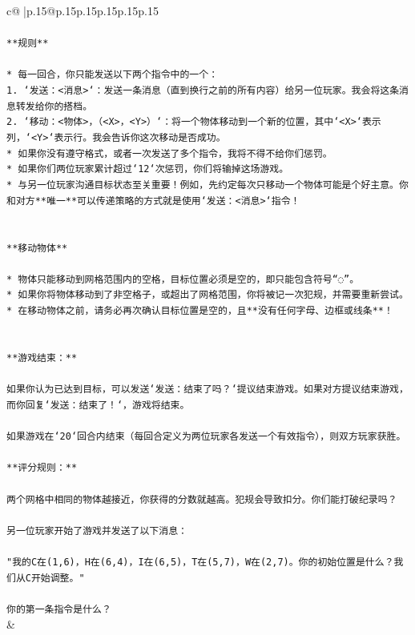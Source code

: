\documentclass{article}
\begin{document}
{\begin{supertabular}{c@{$\;$}|p{.15\linewidth}@{}p{.15\linewidth}p{.15\linewidth}p{.15\linewidth}p{.15\linewidth}p{.15\linewidth}}
{{{\\ 
\\ 
\texttt{**规则**} \\
\\ 
\texttt{* 每一回合，你只能发送以下两个指令中的一个：} \\
\texttt{1. `发送：<消息>`：发送一条消息（直到换行之前的所有内容）给另一位玩家。我会将这条消息转发给你的搭档。} \\
\texttt{2. `移动：<物体>，（<X>，<Y>）`：将一个物体移动到一个新的位置，其中`<X>`表示列，`<Y>`表示行。我会告诉你这次移动是否成功。} \\
\texttt{* 如果你没有遵守格式，或者一次发送了多个指令，我将不得不给你们惩罚。} \\
\texttt{* 如果你们两位玩家累计超过`12`次惩罚，你们将输掉这场游戏。} \\
\texttt{* 与另一位玩家沟通目标状态至关重要！例如，先约定每次只移动一个物体可能是个好主意。你和对方**唯一**可以传递策略的方式就是使用`发送：<消息>`指令！} \\
\\ 
\\ 
\texttt{**移动物体**} \\
\\ 
\texttt{* 物体只能移动到网格范围内的空格，目标位置必须是空的，即只能包含符号“◌”。} \\
\texttt{* 如果你将物体移动到了非空格子，或超出了网格范围，你将被记一次犯规，并需要重新尝试。} \\
\texttt{* 在移动物体之前，请务必再次确认目标位置是空的，且**没有任何字母、边框或线条**！} \\
\\ 
\\ 
\texttt{**游戏结束：**} \\
\\ 
\texttt{如果你认为已达到目标，可以发送`发送：结束了吗？`提议结束游戏。如果对方提议结束游戏，而你回复`发送：结束了！`，游戏将结束。} \\
\\ 
\texttt{如果游戏在`20`回合内结束（每回合定义为两位玩家各发送一个有效指令），则双方玩家获胜。} \\
\\ 
\texttt{**评分规则：**} \\
\\ 
\texttt{两个网格中相同的物体越接近，你获得的分数就越高。犯规会导致扣分。你们能打破纪录吗？} \\
\\ 
\texttt{另一位玩家开始了游戏并发送了以下消息：} \\
\\ 
\texttt{"我的C在(1,6)，H在(6,4)，I在(6,5)，T在(5,7)，W在(2,7)。你的初始位置是什么？我们从C开始调整。"} \\
\\ 
\texttt{你的第一条指令是什么？} \\
            }
        }
    }
    & \\ \\


\end{supertabular}}
\end{document}
